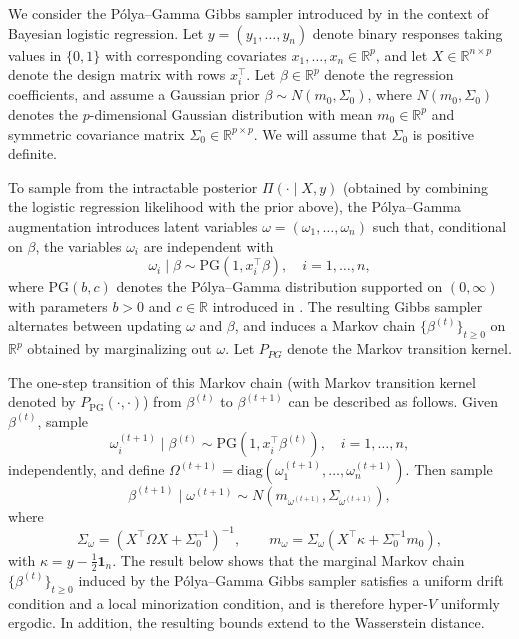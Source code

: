 \documentclass[ejsv2, noshowframe]{imsart}
\theoremstyle{plain}
\theoremstyle{definition}
\theoremstyle{remark}
\newcommand{\R}{\mathbb{R}}
\begin{document}
\noindent
We consider the P\'olya--Gamma Gibbs sampler introduced by \cite{PolsonScottWindle2013} in the context of Bayesian logistic regression. Let $y = (y_1,\dots,y_n)$ denote binary responses taking values in $\{0, 1 \}$ with corresponding covariates $x_1,\dots,x_n \in \R^p$, and let $X \in \R^{n \times p}$ denote the design matrix with rows $x_i^\top$. Let $\beta \in \R^p$ denote the regression coefficients, and assume a Gaussian prior $\beta \sim N(m_0, \Sigma_0)$, where $N(m_0, \Sigma_0)$ denotes the $p$-dimensional Gaussian distribution with mean $m_0 \in \R^p$ and symmetric covariance matrix $\Sigma_0 \in \R^{p \times p}$. We will assume that $\Sigma_0$ is positive definite. 

To sample from the intractable posterior $\Pi(\cdot \mid X, y)$ (obtained by combining the logistic regression likelihood with the prior above), the P\'olya--Gamma augmentation introduces latent variables $\omega = (\omega_1,\dots,\omega_n)$ such that, conditional on $\beta$, the variables $\omega_i$ are independent with
\[
\omega_i \mid \beta \sim \mathrm{PG}(1, x_i^\top \beta), \quad i = 1,\dots,n,
\]
where $\mathrm{PG}(b,c)$ denotes the P\'olya--Gamma distribution supported on $(0,\infty)$ with parameters $b > 0$ and $c \in \R$ introduced in \cite{PolsonScottWindle2013}. The resulting Gibbs sampler alternates between updating $\omega$ and $\beta$, and induces a Markov chain $\{\beta^{(t)}\}_{t \ge 0}$ on $\R^p$ obtained by marginalizing out $\omega$. 
Let $P_{PG}$ denote the Markov transition kernel.

The one-step transition of this Markov chain (with Markov transition kernel denoted by $P_{\mathrm{PG}}(\cdot, \cdot)$) from $\beta^{(t)}$ to $\beta^{(t+1)}$ can be described as follows. Given $\beta^{(t)}$, sample
\[
\omega_i^{(t+1)} \mid \beta^{(t)} \sim \mathrm{PG}(1, x_i^\top \beta^{(t)}), 
\quad i = 1,\dots,n,
\]
independently, and define $\Omega^{(t+1)} = \mathrm{diag}(\omega_1^{(t+1)},\dots,\omega_n^{(t+1)})$. Then sample
\[
\beta^{(t+1)} \mid \omega^{(t+1)} \sim N(m_{\omega^{(t+1)}}, \Sigma_{\omega^{(t+1)}}),
\]
where
\[
\Sigma_{\omega} = \left(X^\top \Omega X + \Sigma_0^{-1}\right)^{-1}, 
\qquad
m_{\omega} = \Sigma_{\omega} \left(X^\top \kappa + \Sigma_0^{-1} m_0 \right),
\]
with $\kappa = y - \tfrac{1}{2}\mathbf{1}_n$. The result below shows that the marginal Markov chain $\{\beta^{(t)}\}_{t\ge 0}$ induced by the P\'olya--Gamma Gibbs sampler satisfies a uniform drift condition and a local minorization condition, and is therefore hyper-$V$ uniformly ergodic. In addition, the resulting bounds extend to the Wasserstein distance.
\end{document}
